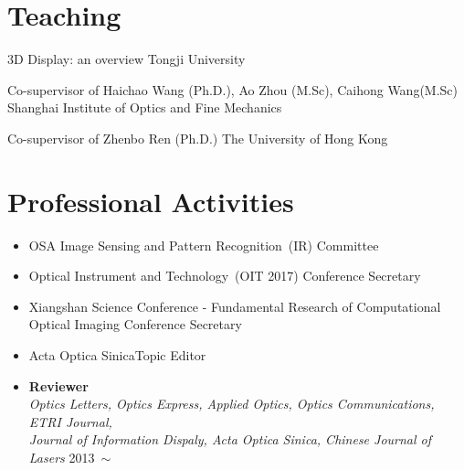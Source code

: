 \documentclass[10pt,a4paper]{moderncv}
\begin{document}

\section{Teaching}
\vspace{3pt}
{3D Display: an overview}
{Tongji University}
{}{}{}

{Co-supervisor of Haichao Wang (Ph.D.), Ao Zhou (M.Sc), Caihong Wang(M.Sc)}
{Shanghai Institute of Optics and Fine Mechanics}
{}
{}
{}

{Co-supervisor of Zhenbo Ren (Ph.D.)}
{The University of Hong Kong}
{}
{}
{}

\section{Professional Activities}
\begin{itemize}
	\item {}
	{OSA Image Sensing and Pattern Recognition~(IR)}
	{Committee}
	{}{\textit{}}{}

	\item {}
	{Optical Instrument and Technology~(OIT 2017)}
	{Conference Secretary}
	{}{\textit{}}{}

	\item {}
	{Xiangshan Science Conference - Fundamental Research of Computational Optical Imaging}
	{Conference Secretary}
	{}{\textit{}}{}

	\item {}
	{Acta Optica Sinica}{Topic Editor}
	{}{\textit{}}{}


	\item \textbf{Reviewer}
	\\{\em Optics Letters, Optics Express, Applied Optics, Optics Communications, ETRI Journal, \\ Journal of Information Dispaly, Acta Optica Sinica, Chinese Journal of Lasers} \hfill 2013~$\sim$

\end{itemize}
\end{document}
